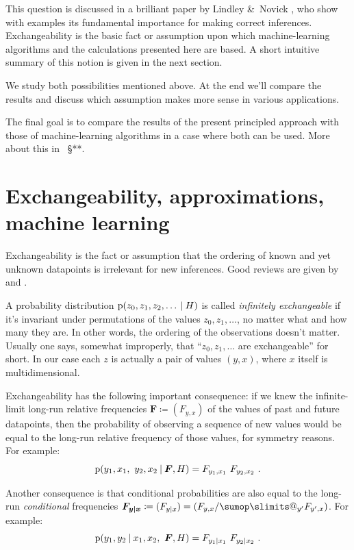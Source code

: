 \documentclass[\ifafour a4paper,12pt,\else a5paper,10pt,\fi%
onecolumn,oneside,article,%
british%
]{memoir}
\makeatletter
\theoremstyle{remark}
\theoremstyle{innote}
\def\sum{\DOTSI\sumop\slimits@}
\newcommand*{\citey}{\parencites*}
\newcommand*{\amp}{\&}
\newcommand*{\defd}{\coloneqq}
\newcommand*{\p}{\mathrm{p}}%
\renewcommand*{\|}[1][]{\nonscript\:#1\vert\nonscript\:\mathopen{}}
\renewcommand*{\=}{\TextOrMath\texteq\eq}
\newcommand*{\sect}{\S}%
\newcommand*{\wrench}{{\fontencoding{U}\fontfamily{fontawesomethree}\selectfont\symbol{114}}}
\newcommand{\mynote}[1]{ {\color{notecolour}#1}}
\newcommand*{\yF}{\bm{F}}
\newcommand*{\yFyx}{\yF_{\bm{y\mid x}}}
\makeatother
\begin{document}
This question is discussed in a brilliant paper by Lindley \amp\ Novick
\citey{lindleyetal1981}, who show with examples its fundamental importance
for making correct inferences. Exchangeability is the basic fact or
assumption upon which machine-learning algorithms and the calculations
presented here are based. A short intuitive summary of this notion is given
in the next section.

We study both possibilities mentioned above. At the end we'll compare the
results and discuss which assumption makes more sense in various
applications.

The final goal is to compare the results of the present principled approach
with those of machine-learning algorithms in a case where both can be used.
More about this in \mynote{\wrench\ \sect***}.

\section{Exchangeability, approximations, machine learning}
\label{sec:exchang}

Exchangeability is the fact or assumption that the ordering of
known and yet unknown datapoints is irrelevant for new inferences. Good
reviews are given by \textcite{dawid2013} and
\textcite[\sect~4.2]{bernardoetal1994}.

A probability distribution $\p(z_{0}, z_{1}, z_{2}, \dotsc \| H)$ is called
\emph{infinitely exchangeable} if it's invariant under permutations of the
values $z_{0}, z_{1}, \dotsc$, no matter what and how many they are. In
other words, the ordering of the observations doesn't matter. Usually one
says, somewhat improperly, that \enquote{$z_{0}, z_{1}, \dotsc$ are
  exchangeable} for short. In our case each $z$ is actually a pair of
values $(y,x)$, where $x$ itself is multidimensional.

Exchangeability has the following important consequence: if we knew the
infinite-limit long-run relative frequencies $\yF\defd (F_{y,x})$ of the
values of past and future datapoints, then the probability of observing a
sequence of new values would be equal to the long-run relative frequency of
those values, for symmetry reasons. For example:
\begin{equation}
  \label{eq:prob_freq}
  \p(y_{1},x_{1},\ y_{2},x_{2} \| \yF, H) = F_{y_{1},x_{1}} \ 
  F_{y_{2},x_{2}} \ .
\end{equation}

Another consequence is that conditional probabilities are also equal to the
long-run \emph{conditional} frequencies $\yFyx \defd (F_{y \|x}) =
(F_{y,x}/\sum_{y'}F_{y',x})$. For example:
\begin{equation}
  \label{eq:prob_cond_freq}
  \p(y_{1}, y_{2}\| x_{1}, x_{2},\ \yF, H) = F_{y_{1}\|x_{1}} \ 
  F_{y_{2}\|x_{2}} \ .
\end{equation}
\end{document}
